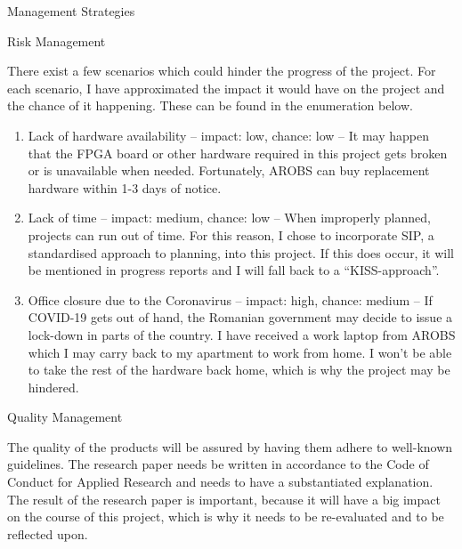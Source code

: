 \documentclass{matthijs}
\begin{document}
	\begin{hoofdstuk}{Management Strategies}

		\begin{paragraaf}{Risk Management}

			There exist a few scenarios which could hinder the progress of the project.
			For each scenario, I have approximated the impact it would have on the project and the chance of it happening.
			These can be found in the enumeration below.

			\begin{enumerate}

				\item	Lack of hardware availability -- impact: low, chance: low --
					It may happen that the FPGA board or other hardware required in this project gets broken or is unavailable when needed.
					Fortunately, AROBS can buy replacement hardware within 1-3 days of notice.
				
				\item	Lack of time -- impact: medium, chance: low --
					When improperly planned, projects can run out of time.
					For this reason, I chose to incorporate SIP, a standardised approach to planning, into this project.
					If this does occur, it will be mentioned in progress reports and I will fall back to a \enquote{KISS-approach}.

				\item	Office closure due to the Coronavirus -- impact: high, chance: medium --
					If COVID-19 gets out of hand, the Romanian government may decide to issue a lock-down in parts of the country.
					I have received a work laptop from AROBS which I may carry back to my apartment to work from home.
					I won't be able to take the rest of the hardware back home, which is why the project may be hindered.

			\end{enumerate}

		\end{paragraaf}
		
		\begin{paragraaf}{Quality Management}

			The quality of the products will be assured by having them adhere to well-known guidelines.
			The research paper needs be written in accordance to the Code of Conduct for Applied Research \cite{andriessen2010gedragscode} and needs to have a substantiated explanation.
			The result of the research paper is important, because it will have a big impact on the course of this project, which is why it needs to be re-evaluated and to be reflected upon.
			

\end{paragraaf}
\end{hoofdstuk}
\end{document}

